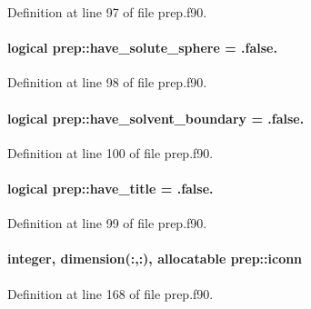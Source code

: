 Definition at line 97 of file prep.\-f90.

\hypertarget{classprep_ae5fc82378da688778b62b1855f535646}{
\paragraph[{have\-\_\-solute\-\_\-sphere}]{\setlength{\rightskip}{0pt plus 5cm}logical prep\-::have\-\_\-solute\-\_\-sphere = .false.}}\label{classprep_ae5fc82378da688778b62b1855f535646}


Definition at line 98 of file prep.\-f90.

\hypertarget{classprep_a8c26fbee1c34fbb32339ce304880a6fb}{
\paragraph[{have\-\_\-solvent\-\_\-boundary}]{\setlength{\rightskip}{0pt plus 5cm}logical prep\-::have\-\_\-solvent\-\_\-boundary = .false.}}\label{classprep_a8c26fbee1c34fbb32339ce304880a6fb}


Definition at line 100 of file prep.\-f90.

\hypertarget{classprep_aef51fe5ef8e99e94ce6215e4862693ab}{
\paragraph[{have\-\_\-title}]{\setlength{\rightskip}{0pt plus 5cm}logical prep\-::have\-\_\-title = .false.}}\label{classprep_aef51fe5ef8e99e94ce6215e4862693ab}


Definition at line 99 of file prep.\-f90.

\hypertarget{classprep_a5a02e0194d123205200fc6c1f8267df4}{
\paragraph[{iconn}]{\setlength{\rightskip}{0pt plus 5cm}integer, dimension(\-:,\-:), allocatable prep\-::iconn}}\label{classprep_a5a02e0194d123205200fc6c1f8267df4}


Definition at line 168 of file prep.\-f90.

